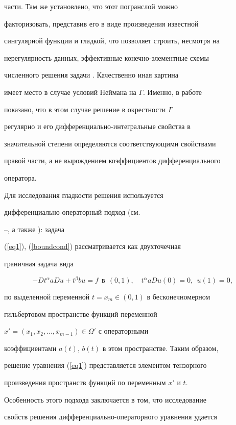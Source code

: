 части. Там же установлено, что этот погранслой можно


факторизовать, представив его в виде произведения известной


сингулярной функции и гладкой, что позволяет строить, несмотря на


нерегулярность данных, эффективные конечно-элементные схемы


численного решения задачи \cite{DE-00}. Качественно иная картина


имеет место в случае условий Неймана на $\Gamma$. Именно, в работе


показано, что в этом случае решение в окрестности $\Gamma$


регулярно и его дифференциально-интегральные свойства в


значительной степени определяются соответствующими свойствами


правой части, а не вырождением коэффициентов дифференциального


оператора.





Для исследования гладкости решения используется


дифференциально-операторный подход (см.


\cite{Dezin80}--\cite{Dezin00}, а также \cite{IzVuz03-1}): задача


(\ref{eq1}), (\ref{boundcond}) рассматривается как двухточечная


граничная задача вида


$$


-Dt^\alpha aDu +t^\beta bu=f \ \ \text{в}\ \ (0,1), \quad


t^\alpha aDu(0)=0,\ \ u(1)=0,


$$


по выделенной переменной $t=x_m \in (0,1)$ в бесконечномерном


гильбертовом пространстве функций переменной


$x'=(x_1,x_2,\dotsc,x_{m-1}) \in \Omega'$ с операторными


коэффициентами $a(t)$, $b(t)$ в этом пространстве. Таким образом,


решение уравнения (\ref{eq1}) представляется элементом тензорного


произведения пространств функций по переменным $x'$ и $t$.


Особенность этого подхода заключается в том, что исследование


свойств решения дифференциально-операторного уравнения удается


